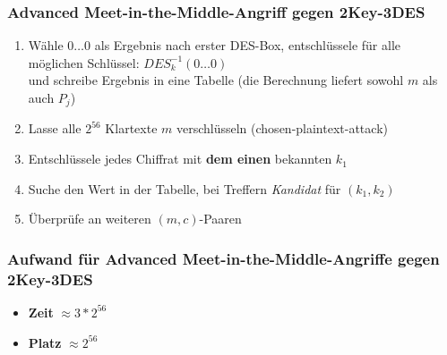 \documentclass[12pt,A4]{extarticle}
\begin{document}
\subsubsection{Advanced Meet-in-the-Middle-Angriff gegen 2Key-3DES}
\begin{enumerate}
  \item{Wähle $0 \dots 0$ als Ergebnis nach erster DES-Box, entschlüssele für alle möglichen Schlüssel: $DES^{-1}_k(0 \dots 0)$\\
              und schreibe Ergebnis in eine Tabelle (die Berechnung liefert sowohl $m$ als auch $P_j$)}
  \item{Lasse alle $2^{56}$ Klartexte $m$ verschlüsseln (chosen-plaintext-attack)}
  \item{Entschlüssele jedes Chiffrat mit \textbf{dem einen} bekannten $k_1$}
  \item{Suche den Wert in der Tabelle, bei Treffern \textit{Kandidat} für $(k_1, k_2)$}
  \item{Überprüfe an weiteren $(m, c)$-Paaren}
\end{enumerate}

\subsubsection{Aufwand für Advanced Meet-in-the-Middle-Angriffe gegen 2Key-3DES}
\begin{itemize}
  \item{\textbf{Zeit} $\approx 3 * 2^{56}$}
  \item{\textbf{Platz} $\approx 2^{56}$}
\end{itemize}
\end{document}

